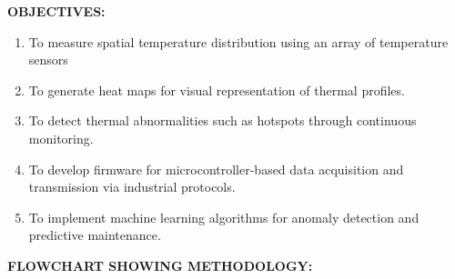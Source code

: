 \documentclass[12pt,a4paper]{article}
\begin{document}
\vspace{12pt}

\noindent
\textbf{OBJECTIVES:}

\vspace{8pt}

\begin{enumerate}
\item To measure spatial temperature distribution using an array of temperature sensors
\item To generate heat maps for visual representation of thermal profiles.
\item To detect thermal abnormalities such as hotspots through continuous monitoring.
\item To develop firmware for microcontroller-based data acquisition and transmission via industrial protocols.
\item To implement machine learning algorithms for anomaly detection and predictive maintenance.
\end{enumerate}

\vspace{12pt}
\newpage


\noindent
\textbf{FLOWCHART SHOWING METHODOLOGY:}

\vspace{12pt}
\end{document}
